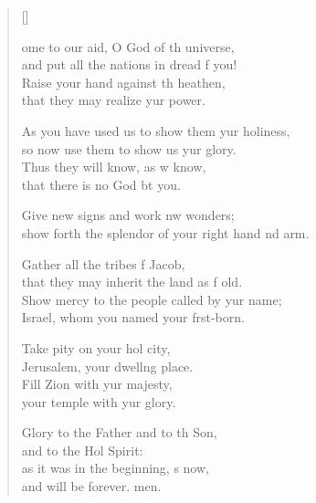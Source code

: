 \settowidth{\versewidth}{show forth the splendor of your right hand and arm.}
\begin{verse}[\versewidth]
  \begin{patverse}
ome to our aid, O God of th universe,\Med\\
and put all the nations in dread f you!\\
Raise your hand against th heathen,\Med\\
that they may realize yur power.

As you have used us to show them yur holiness,\Med\\
so now use them to show us yur glory.\\
Thus they will know, as w know,\Med\\
that there is no God bt you.

Give new signs and work nw wonders;\Med\\
show forth the splendor of your right hand nd arm.

Gather all the tribes f Jacob,\Med\\
that they may inherit the land as f old.\\
Show mercy to the people called by yur name;\Med\\
Israel, whom you named your f\pointup{\i}rst-born.

Take pity on your hol city,\Med\\
Jerusalem, your dwell\pointup{\i}ng place.\\
Fill Zion with yur majesty,\Med\\
your temple with yur glory.

Glory to the Father and to th Son,\Med\\
and to the Hol Spirit:\\
as it was in the beginning, \pointup{\i}s now,\Med\\
and will be forever. men. 
  \end{patverse}
\end{verse}
